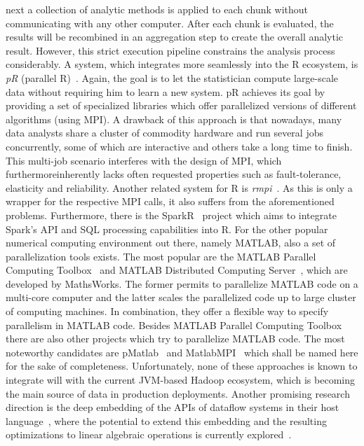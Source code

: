 next a collection of analytic methods is applied to each chunk without communicating with any other computer. After each chunk is evaluated, the results will be recombined in an aggregation step to create the overall analytic result. However, this strict execution pipeline constrains the analysis process considerably. A system, which integrates more seamlessly into the R ecosystem, is {\em pR} (parallel R)~\cite{samatova:2009a}. Again, the goal is to let the statistician compute large-scale data without requiring him to learn a new system. pR achieves its goal by providing a set of specialized libraries which offer parallelized versions of different algorithms (using MPI). A drawback of this approach is that nowadays, many data analysts share a cluster of commodity hardware and run several jobs concurrently, some of which are interactive and others take a long time to finish. This multi-job scenario interferes with the design of MPI, which furthermoreinherently lacks often requested properties such as fault-tolerance, elasticity and reliability. Another related system for R is {\em rmpi}~\cite{rmpi}. As this is only a wrapper for the respective MPI calls, it also suffers from the aforementioned problems. Furthermore, there is the SparkR~\cite{Venkataraman2016} project which aims to integrate Spark's API and SQL processing capabilities into R. For the other popular numerical computing environment out there, namely MATLAB, also a set of parallelization tools exists. The most popular are the MATLAB Parallel Computing Toolbox~\cite{parallelComputingToolbox} and MATLAB Distributed Computing Server~\cite{distributedComputingServer}, which are developed by MathsWorks. The former permits to parallelize MATLAB code on a multi-core computer and the latter scales the parallelized code up to large cluster of computing machines. In combination, they offer a flexible way to specify parallelism in MATLAB code. Besides MATLAB Parallel Computing Toolbox there are also other projects which try to parallelize MATLAB code. The most noteworthy candidates are pMatlab~\cite{bliss:ijhpca2007a} and MatlabMPI~\cite{kepner:jpdc2004a} which shall be named here for the sake of completeness. Unfortunately, none of these approaches is known to integrate will with the current JVM-based Hadoop ecosystem, which is becoming the main source of data in production deployments. Another promising research direction is the deep embedding of the APIs of dataflow systems in their host language~\cite{Alexandrov2015}, where the potential to extend this embedding and the resulting optimizations to linear algebraic operations is currently explored~\cite{Kunft2016}.